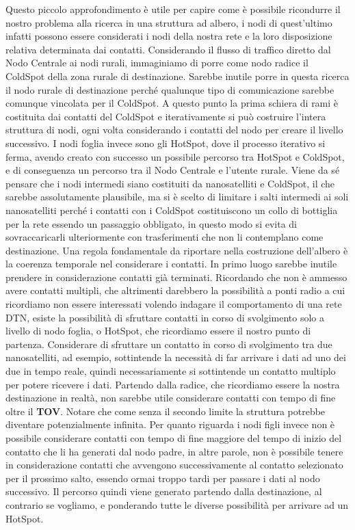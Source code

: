 \documentclass[12pt,a4paper,oneside]{book}
\begin{document}
		Questo piccolo approfondimento è utile per capire come è possibile ricondurre il nostro problema alla ricerca in una struttura ad albero, i nodi di quest'ultimo infatti possono essere considerati i nodi della nostra rete e la loro disposizione relativa determinata dai contatti. Considerando il flusso di traffico diretto dal Nodo Centrale ai nodi rurali, immaginiamo di porre come nodo radice il ColdSpot della zona rurale di destinazione. Sarebbe inutile porre in questa ricerca il nodo rurale di destinazione perché qualunque tipo di comunicazione sarebbe comunque vincolata per il ColdSpot. A questo punto la prima schiera di rami è costituita dai contatti del ColdSpot e iterativamente si può costruire l'intera struttura di nodi, ogni volta considerando i contatti del nodo per creare il livello successivo. I nodi foglia invece sono gli HotSpot, dove il processo iterativo si ferma, avendo creato con successo un possibile percorso tra HotSpot e ColdSpot, e di conseguenza un percorso tra il Nodo Centrale e l'utente rurale. Viene da sé pensare che i nodi intermedi siano costituiti da nanosatelliti e ColdSpot, il che sarebbe assolutamente plausibile, ma si è scelto di limitare i salti intermedi ai soli nanosatelliti perché i contatti con i ColdSpot costituiscono un collo di bottiglia per la rete essendo un passaggio obbligato, in questo modo si evita di sovraccaricarli ulteriormente con trasferimenti che non li contemplano come destinazione. Una regola fondamentale da riportare nella costruzione dell'albero è la coerenza temporale nel considerare i contatti. In primo luogo sarebbe inutile prendere in considerazione contatti già terminati. Ricordando che non è ammesso avere contatti multipli, che altrimenti darebbero  la possibilità a ponti radio a cui ricordiamo non essere interessati volendo indagare il comportamento di una rete DTN, esiste la possibilità di sfruttare contatti in corso di svolgimento solo a livello di nodo foglia, o HotSpot, che ricordiamo essere il nostro punto di partenza. Considerare di sfruttare un contatto in corso di svolgimento tra due nanosatelliti, ad esempio, sottintende la necessità di far arrivare i dati ad uno dei due in tempo reale, quindi necessariamente si sottintende un contatto multiplo per potere ricevere i dati. Partendo dalla radice, che ricordiamo essere la nostra destinazione in realtà, non sarebbe utile considerare contatti con tempo di fine oltre il {\bf TOV}. Notare che come senza il secondo limite la struttura potrebbe diventare potenzialmente infinita. Per quanto riguarda i nodi figli invece non è possibile considerare contatti con tempo di fine maggiore del tempo di inizio del contatto che li ha generati dal nodo padre, in altre parole, non è possibile tenere in considerazione contatti che avvengono successivamente al contatto selezionato per il prossimo salto, essendo ormai troppo tardi per passare i dati al nodo successivo. Il percorso quindi viene generato partendo dalla destinazione, al contrario se vogliamo, e ponderando tutte le diverse possibilità per arrivare ad un HotSpot.
		
\end{document}
